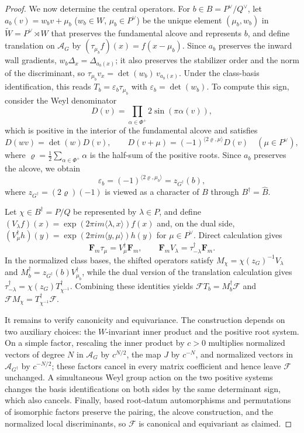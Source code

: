 \documentclass[11pt,a4paper,reqno]{amsart}
\theoremstyle{plain}
\theoremstyle{definition}
\theoremstyle{remark}
\numberwithin{equation}{section}
\newcommand{\pair}[2]{\langle #1,#2\rangle}
\newcommand{\eexp}[1]{\exp(2\pi i #1)}
\begin{document}
\begin{proof}
We now determine the central operators. For $b\in B=P^\vee/Q^\vee$, let $a_b(v)=w_bv+\mu_b$ ($w_b\in W$, $\mu_b\in P^\vee$) be the unique element $(\mu_b,w_b)$ in $\widetilde{W}=P^\vee\rtimes W$ that preserves the fundamental alcove and represents $b$, and define translation on $\mathscr A_G$ by $(\tau_{\mu_b}f)(x)=f(x-\mu_b)$. Since $a_b$ preserves the inward wall gradients, $w_b\Delta_x=\Delta_{a_b(x)}$; it also preserves the stabilizer order and the norm of the discriminant, so $\tau_{\mu_b}v_x=\det(w_b)\,v_{a_b(x)}$. Under the class-basis identification, this reads $T_b=\varepsilon_b\tau_{\mu_b}$ with $\varepsilon_b=\det(w_b)$. To compute this sign, consider the Weyl denominator
\[
D(v)=\prod_{\alpha\in\Phi^+}2\sin(\pi\alpha(v)),
\]
which is positive in the interior of the fundamental alcove and satisfies
\[
D(wv)=\det(w)D(v),\qquad D(v+\mu)=(-1)^{\pair{2\varrho}{\mu}}D(v)\quad(\mu\in P^\vee),
\]
where $\varrho=\tfrac12\sum_{\alpha\in\Phi^+}\alpha$ is the half-sum of the positive roots. Since $a_b$ preserves the alcove, we obtain
\[
\varepsilon_b=(-1)^{\pair{2\varrho}{\mu_b}}=z_{G^\dagger}(b),
\]
where $z_{G^\dagger}=(2\varrho)(-1)$ is viewed as a character of $B$ through $B^\dagger=\widehat B$.

Let $\chi\in B^\dagger=P/Q$ be represented by $\lambda\in P$, and define $(V_\lambda f)(x)=\eexp{m\pair{\lambda}{x}}f(x)$ and, on the dual side, $(V_\mu^\dagger h)(y)=\eexp{m\pair{y}{\mu}}h(y)$ for $\mu\in P^\vee$. Direct calculation gives
\[
\mathbf F_m\tau_\mu=V_\mu^\dagger\mathbf F_m,\qquad\mathbf F_m V_\lambda=\tau_{-\lambda}^\dagger\mathbf F_m.
\]
In the normalized class bases, the shifted operators satisfy $M_\chi=\chi(z_G)^{-1}V_\lambda$ and $M_b^\dagger=z_{G^\dagger}(b)V_{\mu_b}^\dagger$, while the dual version of the translation calculation gives $\tau_{-\lambda}^\dagger=\chi(z_G)T_{\chi^{-1}}^\dagger$. Combining these identities yields $\mathcal F T_b=M_b^\dagger\mathcal F$ and $\mathcal F M_\chi=T_{\chi^{-1}}^\dagger\mathcal F$.

It remains to verify canonicity and equivariance. The construction depends on two auxiliary choices: the $W$-invariant inner product and the positive root system. On a simple factor, rescaling the inner product by $c>0$ multiplies normalized vectors of degree $N$ in $\mathscr A_G$ by $c^{N/2}$, the map $J$ by $c^{-N}$, and normalized vectors in $\mathscr A_{G^\dagger}$ by $c^{-N/2}$; these factors cancel in every matrix coefficient and hence leave $\mathcal F$ unchanged. A simultaneous Weyl group action on the two positive systems changes the basis identifications on both sides by the same determinant sign, which also cancels. Finally, based root-datum automorphisms and permutations of isomorphic factors preserve the pairing, the alcove construction, and the normalized local discriminants, so $\mathcal F$ is canonical and equivariant as claimed.
\end{proof}
\end{document}
